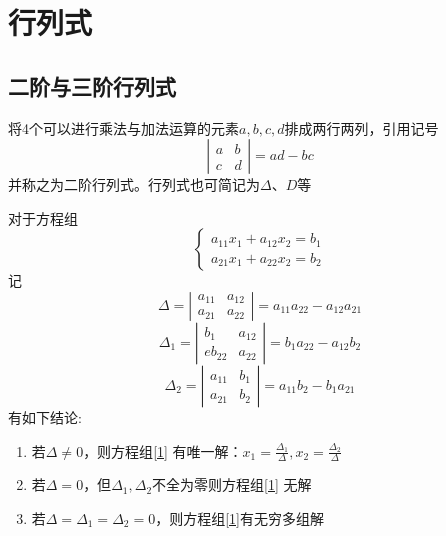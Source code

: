 \section{行列式}

\subsection{二阶与三阶行列式}

\begin{definition}[二阶行列式]
  将4个可以进行乘法与加法运算的元素$a,b,c,d$排成两行两列，引用记号
  $$\left|\begin{array}{ll}
    a & b \\
    c & d
    \end{array}\right|=ad-bc$$
  并称之为{\heiti 二阶行列式}。行列式也可简记为$\Delta$、$D$等
\end{definition}

\begin{theorem}
  对于方程组
  \begin{equation}\label{1}
  \left\{\begin{array}{l}a_{11} x_{1}+a_{12} x_{2}=b_{1} \\ a_{21} x_{1}+a_{22} x_{2}=b_{2}\end{array}\right.
  \end{equation}
  记$$\Delta= \left|\begin{array}{ll}
    a_{11} & a_{12} \\
    a_{21} & a_{22}
    \end{array}\right|=a_{11}a_{22}-a_{12}a_{21}$$
    $$\Delta_1= \left|\begin{array}{ll}
      b_{1} & a_{12} \\e
      b_{22} & a_{22}
      \end{array}\right|=b_{1}a_{22}-a_{12}b_{2}$$
    $$\Delta_2= \left|\begin{array}{ll}
      a_{11} & b_{1} \\
      a_{21} & b_{2}
      \end{array}\right|=a_{11}b_{2}-b_{1}a_{21}$$
      有如下结论:
    \begin{enumerate}
      \item 若$\Delta \neq 0$，则方程组\eqref{1} 有唯一解：$\displaystyle{x_1=\frac{\Delta_1}{\Delta},x_2=\frac{\Delta_2}{\Delta}}$
      \item 若$\Delta=0$，但$\Delta_1,\Delta_2$不全为零则方程组\eqref{1} 无解
      \item 若$\Delta=\Delta_1=\Delta_2=0$，则方程组\eqref{1}有无穷多组解
    \end{enumerate}
\end{theorem}

